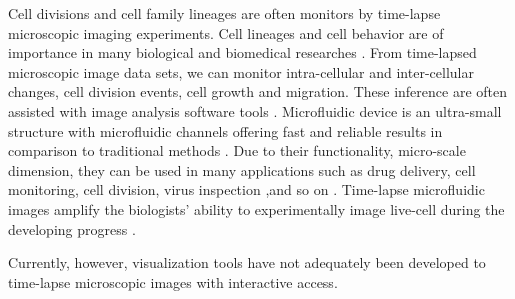 \documentclass[conference]{IEEEtran}
\begin{document}
Cell divisions and cell family lineages are often monitors by time-lapse microscopic imaging experiments. 
Cell lineages and cell behavior are of importance in many biological and biomedical researches \cite{r2.6}. 
From time-lapsed microscopic image data sets, we can monitor intra-cellular and inter-cellular changes, cell division events, cell growth and migration. These inference are often assisted with image analysis software tools \cite{r2.7}.
Microfluidic device is an ultra-small structure with microfluidic channels offering fast and reliable results in comparison to traditional methods \cite {r2.1,r2.2}. Due to their functionality, micro-scale dimension, they can be used in many applications such as drug delivery, cell monitoring, cell division, virus inspection ,and so on \cite{r2.3,r2.4}. Time-lapse microfluidic images amplify the biologists' ability to experimentally image live-cell during the developing progress \cite{r3}.


Currently, however, visualization tools have not adequately been developed to time-lapse microscopic images with interactive access.
\end{document}
